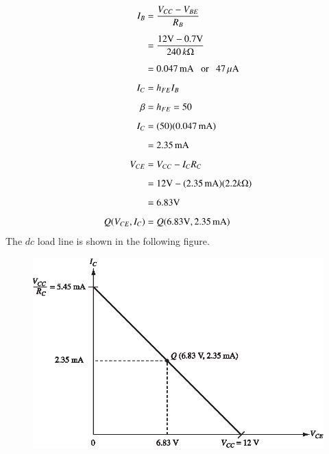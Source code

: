 \begin{solution}
\begin{align*}
I_{B} &= \frac{V_{CC}-V_{BE}}{R_{B}}\\[5pt]
&= \frac{12\text{V}-0.7\text{V}}{240\, k\Omega}\\[5pt]
&= 0.047\text{\,mA}\text{~~ or~~ } 47\,\mu\text{A}\\[5pt]
I_{C} &= h_{FE}I_{B}\\[5pt]
\beta &= h_{FE}=50\\[5pt]
I_{C} &= (50)(0.047\text{\,mA})\\[5pt]
&= 2.35\text{\,mA}\\[5pt]
V_{CE} &= V_{CC}-I_{C}R_{C}\\[5pt]
&= 12\text{V}-(2.35\text{\,mA})(2.2 k\Omega)\\[5pt]
&= 6.83\text{V}\\[5pt]
Q(V_{CE},I_{C}) &= Q(6.83\text{V},2.35\text{\,mA})
\end{align*}
The $dc$ load line is shown in the following figure.
\begin{figure}[H]
\centering
\includegraphics[scale=1.07]{chap3/S3-EE-03-IN010.eps}
\end{figure}
\vskip -1cm
\end{solution}

\eject

